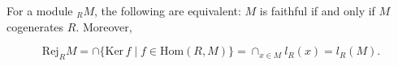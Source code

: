 For a module $_R M$, the following are equivalent: $M$ is faithful if and only if $M$ cogenerates $R$. Moreover,

$$\mathrm{Rej}_R M = \cap \{ \mathrm{Ker}\, f \mid f \in \mathrm{Hom}(R, M) \} = \cap_{x \in M} l_R(x) = l_R(M).$$
